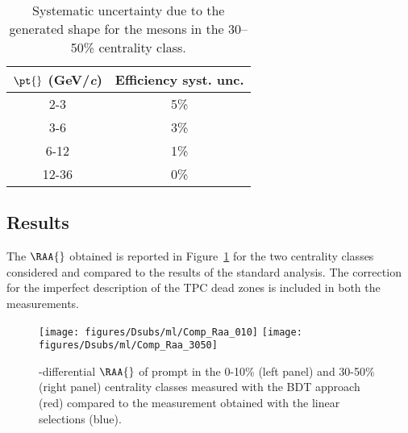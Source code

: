\begin{table}[htbp]
\begin{center}
  \begin{tabular}{|c|c|}
  \hline
  \textbf{$\mathbf{\pt{}}$ (GeV/\textit{c})} & \textbf{Efficiency syst. unc.} \\
  \hline
  2-3 & 5\%\\
  \hline
  3-6 & 3\%\\
  \hline
  6-12 & 1\%\\
  \hline
  12-36 & 0\%\\
  \hline
  \end{tabular}
\end{center}
\caption{Systematic uncertainty due to the generated \pt{} shape for the \Dsubs{} mesons in the 30--50\% centrality class.}
\label{tab:DsGenPtSyst3050_ml}
\end{table}

\subsection{Results}
The \(\RAA{}\) obtained is reported in Figure~\ref{fig:raa_ml} for the two centrality classes considered and compared to the results of the 
standard analysis. The correction for the imperfect description of the TPC dead zones is included in both the measurements. 
\begin{figure}[htbp]
  \begin{center}
   \texttt{[image: figures/Dsubs/ml/Comp\_Raa\_010]}
   \texttt{[image: figures/Dsubs/ml/Comp\_Raa\_3050]} 
  \caption{\pt{}-differential \(\RAA{}\) of prompt \Dsubs{} in the 0-10\% (left panel) and 30-50\% (right panel) centrality classes 
           measured with the BDT approach (red) compared to the measurement obtained with the linear selections (blue).}
  \label{fig:raa_ml}
  \end{center}
\end{figure}

\clearpage

